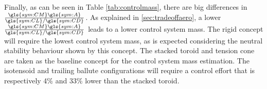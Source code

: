 Finally, as can be seen in Table \ref{tab:controlmass}, there are big differences in $\frac{\gls{sym:CM}\gls{sym:A}}{\gls{sym:CL}/\gls{sym:CD}}$. As explained in \ref{sec:tradeoffaero}, a lower $\frac{\gls{sym:CM}\gls{sym:A}}{\gls{sym:CL}/\gls{sym:CD}}$ leads to a lower control system mass. The rigid concept will require the lowest control system mass, as is expected considering the neutral stability behaviour shown by this concept. The stacked toroid and tension cone are taken as the baseline concept for the control system mass estimation. The isotensoid and trailing ballute configurations will require a control effort that is respectively 4\% and 33\%  lower than the stacked toroid. 


